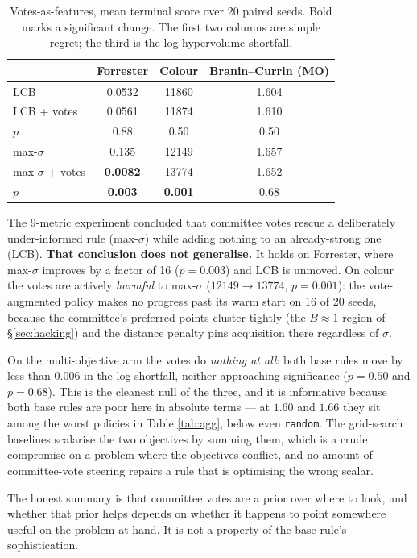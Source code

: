 \documentclass[11pt]{article}
\begin{document}
\begin{table}[H]
\centering
\small
\begin{tabular}{lccc}
\toprule
 & Forrester & Colour & Branin--Currin (MO) \\
\midrule
LCB                 & 0.0532 & 11860 & 1.604 \\
LCB + votes         & 0.0561 & 11874 & 1.610 \\
$p$                 & 0.88   & 0.50 & 0.50 \\
\midrule
max-$\sigma$        & 0.135  & 12149 & 1.657 \\
max-$\sigma$ + votes & \textbf{0.0082} & 13774 & 1.652 \\
$p$                 & \textbf{0.003} & \textbf{0.001} & 0.68 \\
\bottomrule
\end{tabular}
\caption{Votes-as-features, mean terminal score over 20 paired seeds. Bold marks a significant change. The first two columns are simple regret; the third is the log hypervolume shortfall.}
\label{tab:votes}
\end{table}

The 9-metric experiment concluded that committee votes rescue a deliberately under-informed rule (max-$\sigma$) while adding nothing to an already-strong one (LCB). \textbf{That conclusion does not generalise.} It holds on Forrester, where max-$\sigma$ improves by a factor of 16 ($p = 0.003$) and LCB is unmoved. On colour the votes are actively \emph{harmful} to max-$\sigma$ ($12149 \to 13774$, $p = 0.001$): the vote-augmented policy makes no progress past its warm start on 16 of 20 seeds, because the committee's preferred points cluster tightly (the $B\!\approx\!1$ region of \S\ref{sec:hacking}) and the distance penalty pins acquisition there regardless of $\sigma$.

On the multi-objective arm the votes do \emph{nothing at all}: both base rules move by less than $0.006$ in the log shortfall, neither approaching significance ($p = 0.50$ and $p = 0.68$). This is the cleanest null of the three, and it is informative because both base rules are poor here in absolute terms --- at $1.60$ and $1.66$ they sit among the worst policies in Table \ref{tab:agg}, below even \texttt{random}. The grid-search baselines scalarise the two objectives by summing them, which is a crude compromise on a problem where the objectives conflict, and no amount of committee-vote steering repairs a rule that is optimising the wrong scalar.

The honest summary is that committee votes are a prior over where to look, and whether that prior helps depends on whether it happens to point somewhere useful on the problem at hand. It is not a property of the base rule's sophistication.
\end{document}
